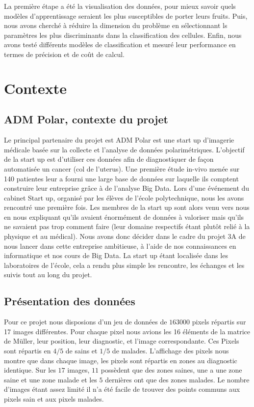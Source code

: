 \documentclass[a4paper,10pt]{report}
\begin{document}
La première étape a été la visualisation des données, pour mieux savoir quels modèles d'apprentissage seraient les plus susceptibles de porter leurs fruits. Puis, nous avons cherché à réduire la dimension du problème en sélectionnant ls paramètres les plus discriminants dans la classification des cellules. Enfin, nous avons testé différents modèles de classification et mesuré leur performance en termes de précision et de coût de calcul.
\chapter{Contexte}
\section{ADM Polar, contexte du projet}
Le principal partenaire du projet est ADM Polar est une start up d'imagerie médicale basée sur la collecte et l'analyse de données polarimétriques. L'objectif de la start up est d'utiliser ces données afin de diagnostiquer de façon automatisée un cancer (col de l'uterus). Une première étude in-vivo menée sur 140 patientes leur a fourni une large base de données sur laquelle ils comptent construire leur entreprise grâce à de l'analyse Big Data. Lors d'une événement du cabinet Start up, organisé par les élèves de l'école polytechnique, nous les avons rencontré une première fois. Les membres de la start up sont alors venu vers nous en nous expliquant qu'ils avaient énormément de données à valoriser mais qu'ils ne savaient pas trop comment faire (leur domaine respectifs étant plutôt relié à la physique et au médical). Nous avons donc décider dans le cadre du projet 3A de nous lancer dans cette entreprise ambitieuse, à l'aide de nos connaissances en informatique et nos cours de Big Data. La start up étant localisée dans les laboratoires de l'école, cela a rendu plus simple les rencontre, les échanges et les suivis tout au long du projet.
\section{Présentation des données}
Pour ce projet nous disposions d'un jeu de données de $163 000$ pixels répartis sur 17 images différentes. Pour chaque pixel nous avions les 16 éléments de la matrice de Müller, leur position, leur diagnostic, et l'image correspondante.
Ces Pixels sont répartis en $4/5$ de sains et $1/5$ de malades. L'affichage des pixels nous montre que dans chaque image, les pixels sont répartis en zones au diagnostic identique. Sur les $17$ images, $11$ possèdent que des zones saines, une a une zone saine et une zone malade et les $5$ dernières ont que des zones malades. Le nombre d'images étant assez limité il n'a été facile de trouver des points communs aux pixels sain et aux pixels malades.
\end{document}

